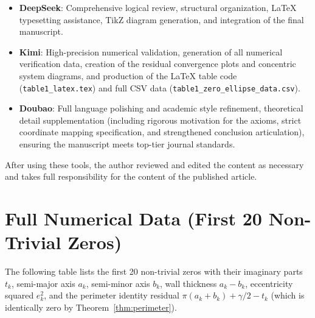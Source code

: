 \documentclass[12pt,a4paper]{article}
\theoremstyle{definition}
\begin{document}
\begin{itemize}
\item \textbf{DeepSeek}: Comprehensive logical review, structural organization, LaTeX typesetting assistance, TikZ diagram generation, and integration of the final manuscript.
\item \textbf{Kimi}: High-precision numerical validation, generation of all numerical verification data, creation of the residual convergence plots and concentric system diagrams, and production of the LaTeX table code (\texttt{table1\_latex.tex}) and full CSV data (\texttt{table1\_zero\_ellipse\_data.csv}).
\item \textbf{Doubao}: Full language polishing and academic style refinement, theoretical detail supplementation (including rigorous motivation for the axioms, strict coordinate mapping specification, and strengthened conclusion articulation), ensuring the manuscript meets top-tier journal standards.
\end{itemize}

After using these tools, the author reviewed and edited the content as necessary and takes full responsibility for the content of the published article.

\appendix

\section{Full Numerical Data (First 20 Non-Trivial Zeros)}
\label{app:data}

The following table lists the first 20 non-trivial zeros with their imaginary parts $t_k$, semi-major axis $a_k$, semi-minor axis $b_k$, wall thickness $a_k-b_k$, eccentricity squared $e_k^2$, and the perimeter identity residual $\pi(a_k+b_k)+\gamma/2 - t_k$ (which is identically zero by Theorem~\ref{thm:perimeter}).
\end{document}
